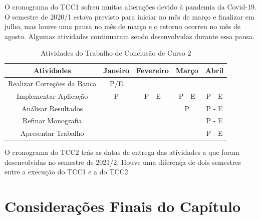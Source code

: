 O cronograma do TCC1 sofreu muitas alterações devido à pandemia da Covid-19. O semestre de 2020/1 estava previsto para iniciar no mês de março e finalizar em julho, mas houve uma pausa no 
mês de março e o retorno ocorreu no mês de agosto. Algumas atividades continuaram sendo desenvolvidas durante essa pausa.



\begin{table}[ht]
	\centering
	\caption{Atividades do Trabalho de Conclusão de Curso 2}
	\label{tab05}
	
	\begin{tabular}{ccccc}
		\toprule
		\textbf{Atividades} & \textbf{Janeiro} & 
		\textbf{Fevereiro}  & \textbf{Março}& \textbf{Abril}\\
		\midrule
		\begin{minipage} [t] {0.2\textwidth} \centering Realizar Correções da Banca \end{minipage} & P/E &  &  &  \\
		\midrule
		\begin{minipage} [t] {0.2\textwidth} \centering Implementar Aplicação \end{minipage} & P & P - E & P - E & P - E  \\
		\midrule
		\begin{minipage} [t] {0.2\textwidth} \centering Análisar Resultados \end{minipage} &  &  &P &P - E  \\
		\midrule
		\begin{minipage} [t] {0.2\textwidth} \centering Refinar Monografia \end{minipage} &  &  &  & P - E \\
		\midrule
		\begin{minipage} [t] {0.2\textwidth} \centering Apresentar Trabalho \end{minipage} &  & & & P - E \\
		\bottomrule
	\end{tabular}
\end{table}

O cronograma do TCC2 trás as datas de entrega das atividades a que foram desenvolvidas no semestre de 2021/2. Houve uma diferença de dois semestres 
entre a execução do TCC1 e a do TCC2.

\section{Considerações Finais do Capítulo}

